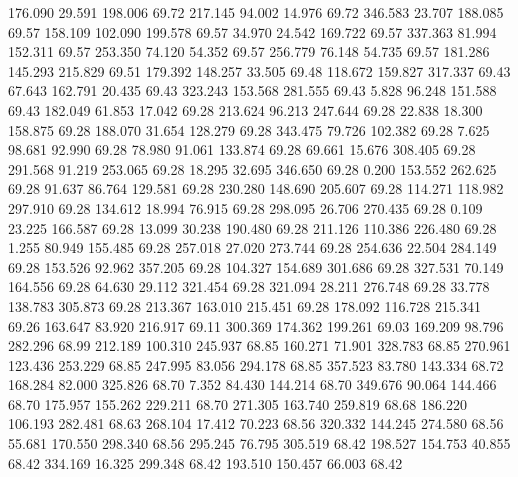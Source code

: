  176.090   29.591  198.006        69.72
 217.145   94.002   14.976        69.72
 346.583   23.707  188.085        69.57
 158.109  102.090  199.578        69.57
  34.970   24.542  169.722        69.57
 337.363   81.994  152.311        69.57
 253.350   74.120   54.352        69.57
 256.779   76.148   54.735        69.57
 181.286  145.293  215.829        69.51
 179.392  148.257   33.505        69.48
 118.672  159.827  317.337        69.43
  67.643  162.791   20.435        69.43
 323.243  153.568  281.555        69.43
   5.828   96.248  151.588        69.43
 182.049   61.853   17.042        69.28
 213.624   96.213  247.644        69.28
  22.838   18.300  158.875        69.28
 188.070   31.654  128.279        69.28
 343.475   79.726  102.382        69.28
   7.625   98.681   92.990        69.28
  78.980   91.061  133.874        69.28
  69.661   15.676  308.405        69.28
 291.568   91.219  253.065        69.28
  18.295   32.695  346.650        69.28
   0.200  153.552  262.625        69.28
  91.637   86.764  129.581        69.28
 230.280  148.690  205.607        69.28
 114.271  118.982  297.910        69.28
 134.612   18.994   76.915        69.28
 298.095   26.706  270.435        69.28
   0.109   23.225  166.587        69.28
  13.099   30.238  190.480        69.28
 211.126  110.386  226.480        69.28
   1.255   80.949  155.485        69.28
 257.018   27.020  273.744        69.28
 254.636   22.504  284.149        69.28
 153.526   92.962  357.205        69.28
 104.327  154.689  301.686        69.28
 327.531   70.149  164.556        69.28
  64.630   29.112  321.454        69.28
 321.094   28.211  276.748        69.28
  33.778  138.783  305.873        69.28
 213.367  163.010  215.451        69.28
 178.092  116.728  215.341        69.26
 163.647   83.920  216.917        69.11
 300.369  174.362  199.261        69.03
 169.209   98.796  282.296        68.99
 212.189  100.310  245.937        68.85
 160.271   71.901  328.783        68.85
 270.961  123.436  253.229        68.85
 247.995   83.056  294.178        68.85
 357.523   83.780  143.334        68.72
 168.284   82.000  325.826        68.70
   7.352   84.430  144.214        68.70
 349.676   90.064  144.466        68.70
 175.957  155.262  229.211        68.70
 271.305  163.740  259.819        68.68
 186.220  106.193  282.481        68.63
 268.104   17.412   70.223        68.56
 320.332  144.245  274.580        68.56
  55.681  170.550  298.340        68.56
 295.245   76.795  305.519        68.42
 198.527  154.753   40.855        68.42
 334.169   16.325  299.348        68.42
 193.510  150.457   66.003        68.42
